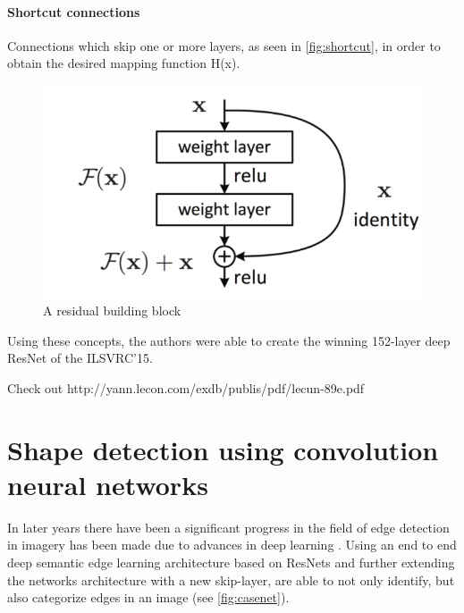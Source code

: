 \paragraph{Shortcut connections}
Connections which skip one or more layers, as seen in \autoref{fig:shortcut}, in order to obtain the desired mapping function H(x).

\begin{figure}[!h]
	\centering
	\includegraphics[scale=0.5]{fig/shortcut_connection.png}
	\caption{A residual building block \citep{Wu2017}}
	\label{fig:shortcut}
\end{figure}

Using these concepts, the authors were able to create the winning 152-layer deep ResNet of the ILSVRC'15.

Check out
http://yann.lecon.com/exdb/publis/pdf/lecun-89e.pdf

\section{Shape detection using convolution neural networks}
In later years there have been a significant progress in the field of edge detection in imagery has been made due to advances in deep learning \citep{Yu2017}. Using an end to end deep semantic edge learning architecture based on ResNets \citep{Wu2017} and further extending the networks architecture with a new skip-layer, \cite{Yu2017} are able to not only identify, but also categorize edges in an image (see \autoref{fig:casenet}).

